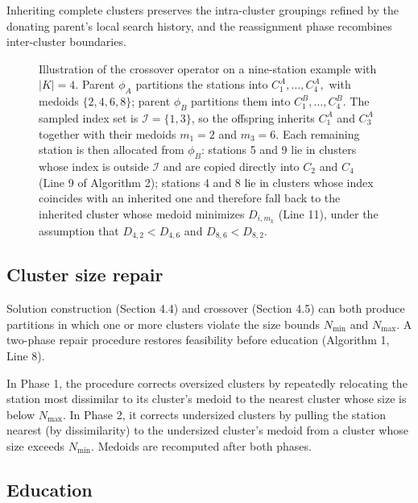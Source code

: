 \documentclass[11pt]{article}
\numberwithin{table}{section}
\numberwithin{figure}{section}
\begin{document}
Inheriting complete clusters preserves the intra-cluster groupings refined by the donating parent's local search history, and the reassignment phase recombines inter-cluster boundaries.

\begin{figure}[htbp]
\centering
{}
\caption{Illustration of the crossover operator on a nine-station example with $\left|K\right|=4$. Parent ${{\phi }_{A}}$ partitions the stations into $C_{1}^{A},\ldots ,C_{4}^{A},$ with medoids $\{2,4,6,8\}$; parent ${{\phi }_{B}}$ partitions them into $C_{1}^{B},\ldots ,C_{4}^{B}$. The sampled index set is $\mathcal{I}=\{1,3\}$, so the offspring inherits $C_{1}^{A}$ and $C_{3}^{A}$ together with their medoids ${{m}_{1}}=2$ and ${{m}_{3}}=6$. Each remaining station is then allocated from ${{\phi }_{B}}$: stations 5 and 9 lie in clusters whose index is outside $\mathcal{I}$ and are copied directly into ${{C}_{2}}$ and ${{C}_{4}}$ (Line 9 of Algorithm 2); stations 4 and 8 lie in clusters whose index coincides with an inherited one and therefore fall back to the inherited cluster whose medoid minimizes ${{D}_{i,{{m}_{k}}}}$ (Line 11), under the assumption that ${{D}_{4,2}}<{{D}_{4,6}}$ and ${{D}_{8,6}}<{{D}_{8,2}}$.}
\end{figure}

\subsection{Cluster size repair}

Solution construction (Section 4.4) and crossover (Section 4.5) can both produce partitions in which one or more clusters violate the size bounds ${{N}_{\min }}$ and ${{N}_{\max }}$. A two-phase repair procedure restores feasibility before education (Algorithm 1, Line 8).

In Phase 1, the procedure corrects oversized clusters by repeatedly relocating the station most dissimilar to its cluster’s medoid to the nearest cluster whose size is below ${{N}_{\max }}$. In Phase 2, it corrects undersized clusters by pulling the station nearest (by dissimilarity) to the undersized cluster’s medoid from a cluster whose size exceeds ${{N}_{\min }}$. Medoids are recomputed after both phases.

\subsection{Education}
\end{document}
